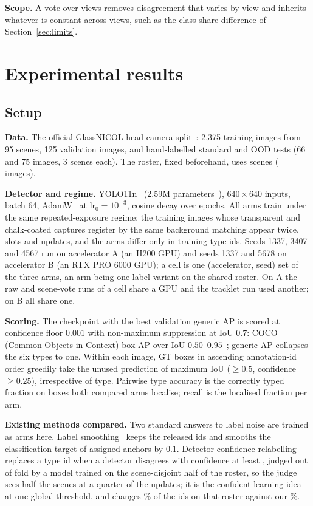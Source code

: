 \documentclass{article}
\begin{document}
\noindent\textbf{Scope.} A vote over views removes disagreement that varies by view and inherits whatever is constant across views, such as the class-share difference of Section~\ref{sec:limits}.

\section{Experimental results}
\label{sec:results}
\subsection{Setup}
\label{sec:setup}
\noindent\textbf{Data.} The official GlassNICOL head-camera split~\cite{gajdosech2025glassnicol}: 2,375 training images from 95 scenes, 125 validation images, and hand-labelled standard and OOD tests (66 and 75 images, 3 scenes each). The roster, fixed beforehand, uses \ScenesTrain{} scenes (\ImagesTrainScene{} images).

\noindent\textbf{Detector and regime.} YOLO11n~\cite{jocher2024yolo11} (2.59M parameters~\cite{sapkota2025yolo}), $640\!\times\!640$ inputs, batch 64, AdamW~\cite{loshchilov2019adamw} at $\mathrm{lr}_0=10^{-3}$, cosine decay over \SceneEpochs{} epochs. All arms train under the same repeated-exposure regime: the \SceneRepeatSlots{} training images whose transparent and chalk-coated captures register by the same background matching appear twice, \SceneSlots{} slots and \SceneUpdates{} updates, and the arms differ only in training type ids. Seeds 1337, 3407 and 4567 run on accelerator A (an H200 GPU) and seeds 1337 and 5678 on accelerator B (an RTX PRO 6000 GPU); a cell is one (accelerator, seed) set of the three arms, an arm being one label variant on the shared roster. On A the raw and scene-vote runs of a cell share a GPU and the tracklet run used another; on B all share one.

\noindent\textbf{Scoring.} The checkpoint with the best validation generic AP is scored at confidence floor $0.001$ with non-maximum suppression at IoU $0.7$: COCO (Common Objects in Context) box AP over IoU $0.50$--$0.95$~\cite{lin2014coco}; generic AP collapses the six types to one. Within each image, GT boxes in ascending annotation-id order greedily take the unused prediction of maximum IoU ($\geq0.5$, confidence $\geq0.25$), irrespective of type. Pairwise type accuracy is the correctly typed fraction on boxes both compared arms localise; recall is the localised fraction per arm.

\noindent\textbf{Existing methods compared.} Two standard answers to label noise are trained as arms here. Label smoothing~\cite{muller2019labelsmoothing} keeps the released ids and smooths the classification target of assigned anchors by $0.1$. Detector-confidence relabelling replaces a type id when a detector disagrees with confidence at least \ConfidConf, judged out of fold by a model trained on the scene-disjoint half of the roster, so the judge sees half the scenes at a quarter of the updates; it is the confident-learning idea~\cite{northcutt2021confident,chachula2026clod} at one global threshold, and changes \ConfidChangedPct\% of the ids on that roster against our \SceneChangedRosterPct\%.
\end{document}
